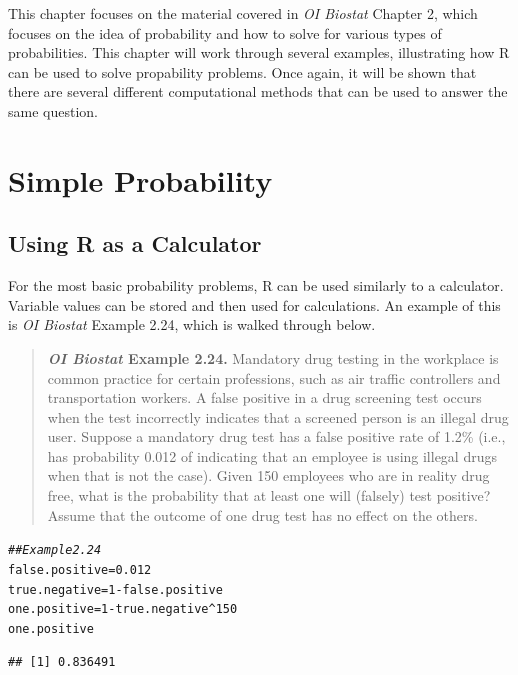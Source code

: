 \documentclass{report}\usepackage[]{graphicx}\usepackage[]{color}
\makeatletter
\newcommand{\hlnum}[1]{\textcolor[rgb]{0.686,0.059,0.569}{#1}}%
\newcommand{\hlcom}[1]{\textcolor[rgb]{0.678,0.584,0.686}{\textit{#1}}}%
\newcommand{\hlopt}[1]{\textcolor[rgb]{0,0,0}{#1}}%
\newcommand{\hlstd}[1]{\textcolor[rgb]{0.345,0.345,0.345}{#1}}%
\newcommand{\hlkwb}[1]{\textcolor[rgb]{0.69,0.353,0.396}{#1}}%
\newenvironment{kframe}{%
 \def\at@end@of@kframe{}%
 \ifinner\ifhmode%
  \def\at@end@of@kframe{\end{minipage}}%
  \begin{minipage}{\columnwidth}%
 \fi\fi%
 \def\FrameCommand##1{\hskip\@totalleftmargin \hskip-\fboxsep
 \colorbox{shadecolor}{##1}\hskip-\fboxsep
     \hskip-\linewidth \hskip-\@totalleftmargin \hskip\columnwidth}%
 \MakeFramed {\advance\hsize-\width
   \@totalleftmargin\z@ \linewidth\hsize
   \@setminipage}}%
 {\par\unskip\endMakeFramed%
 \at@end@of@kframe}
\newenvironment{knitrout}{}{} %
\makeatother
\begin{document}
\vspace{0.5cm} 

This chapter focuses on the material covered in \textit{OI Biostat} Chapter 2, which focuses on the idea of probability and how to solve for various types of probabilities. This chapter will work through several examples, illustrating how \textsf{R} can be used to solve propability problems.  Once again, it will be shown that there are several different computational methods that can be used to answer the same question.  

\section{Simple Probability}

\subsection{Using R as a Calculator}
For the most basic probability problems, \textsf{R} can be used similarly to a calculator.  Variable values can be stored and then used for calculations.  An example of this is \textit{OI Biostat} Example 2.24, which is walked through below.   

\begin{quotation}
\textbf{\textit{OI Biostat} Example 2.24.}  Mandatory drug testing in the workplace is common practice for certain professions, such as air traffic controllers and transportation workers.  A false positive in a drug screening test occurs when the test incorrectly indicates that a screened person is an illegal drug user. Suppose a mandatory drug test has a false positive rate of 1.2\% (i.e., has probability  0.012 of indicating that an employee is using illegal drugs when that is not the case).  Given 150 employees who are in reality drug free, what is the probability that at least one will (falsely) test positive? Assume that the outcome of one drug test has no effect on the others.
\end{quotation}

\begin{knitrout}
\color{fgcolor}\begin{kframe}
\begin{alltt}
\hlcom{## Example 2.24}
\hlstd{false.positive} \hlkwb{=} \hlnum{0.012}
\hlstd{true.negative} \hlkwb{=} \hlnum{1}\hlopt{-}\hlstd{false.positive}
\hlstd{one.positive} \hlkwb{=} \hlnum{1}\hlopt{-}\hlstd{true.negative}\hlopt{^}\hlnum{150}
\hlstd{one.positive}
\end{alltt}
\begin{verbatim}
## [1] 0.836491
\end{verbatim}
\end{kframe}
\end{knitrout}
\end{document}

